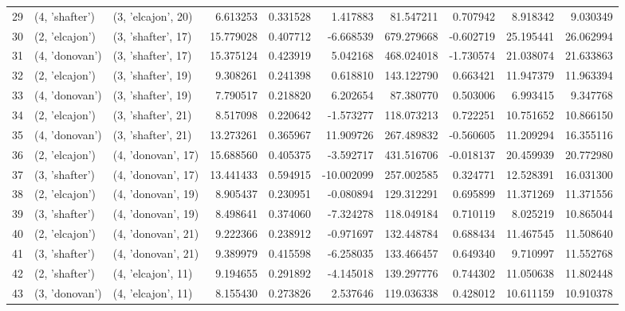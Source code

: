 \begin{tabular}{lllrrrrrrr}
29 &   (4, 'shafter') &  (3, 'elcajon', 20) &   6.613253 &  0.331528 &   1.417883 &    81.547211 &  0.707942 &   8.918342 &   9.030349 \\
30 &   (2, 'elcajon') &  (3, 'shafter', 17) &  15.779028 &  0.407712 &  -6.668539 &   679.279668 & -0.602719 &  25.195441 &  26.062994 \\
31 &   (4, 'donovan') &  (3, 'shafter', 17) &  15.375124 &  0.423919 &   5.042168 &   468.024018 & -1.730574 &  21.038074 &  21.633863 \\
32 &   (2, 'elcajon') &  (3, 'shafter', 19) &   9.308261 &  0.241398 &   0.618810 &   143.122790 &  0.663421 &  11.947379 &  11.963394 \\
33 &   (4, 'donovan') &  (3, 'shafter', 19) &   7.790517 &  0.218820 &   6.202654 &    87.380770 &  0.503006 &   6.993415 &   9.347768 \\
34 &   (2, 'elcajon') &  (3, 'shafter', 21) &   8.517098 &  0.220642 &  -1.573277 &   118.073213 &  0.722251 &  10.751652 &  10.866150 \\
35 &   (4, 'donovan') &  (3, 'shafter', 21) &  13.273261 &  0.365967 &  11.909726 &   267.489832 & -0.560605 &  11.209294 &  16.355116 \\
36 &   (2, 'elcajon') &  (4, 'donovan', 17) &  15.688560 &  0.405375 &  -3.592717 &   431.516706 & -0.018137 &  20.459939 &  20.772980 \\
37 &   (3, 'shafter') &  (4, 'donovan', 17) &  13.441433 &  0.594915 & -10.002099 &   257.002585 &  0.324771 &  12.528391 &  16.031300 \\
38 &   (2, 'elcajon') &  (4, 'donovan', 19) &   8.905437 &  0.230951 &  -0.080894 &   129.312291 &  0.695899 &  11.371269 &  11.371556 \\
39 &   (3, 'shafter') &  (4, 'donovan', 19) &   8.498641 &  0.374060 &  -7.324278 &   118.049184 &  0.710119 &   8.025219 &  10.865044 \\
40 &   (2, 'elcajon') &  (4, 'donovan', 21) &   9.222366 &  0.238912 &  -0.971697 &   132.448784 &  0.688434 &  11.467545 &  11.508640 \\
41 &   (3, 'shafter') &  (4, 'donovan', 21) &   9.389979 &  0.415598 &  -6.258035 &   133.466457 &  0.649340 &   9.710997 &  11.552768 \\
42 &   (2, 'shafter') &  (4, 'elcajon', 11) &   9.194655 &  0.291892 &  -4.145018 &   139.297776 &  0.744302 &  11.050638 &  11.802448 \\
43 &   (3, 'donovan') &  (4, 'elcajon', 11) &   8.155430 &  0.273826 &   2.537646 &   119.036338 &  0.428012 &  10.611159 &  10.910378 \\

\end{tabular}
